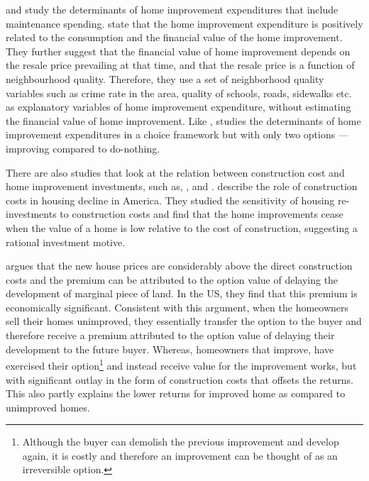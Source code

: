 \documentclass[AEJ,reqno, draftmode]{AEA} %
\begin{document}
\citet{boehm1986improvement} and \citet{galster1987homeowners} study the determinants of home improvement expenditures that include maintenance spending. \citet{boehm1986improvement} state that the home improvement expenditure is positively related to the consumption and the financial value of the home improvement. They further suggest that the financial value of home improvement depends on the resale price prevailing at that time, and that the resale price is a function of neighbourhood quality. Therefore, they use a set of neighborhood quality variables such as crime rate in the area, quality of schools, roads, sidewalks etc. as explanatory variables of home improvement expenditure, without estimating the financial value of home improvement. Like \citet{montgomery1992explaining}, \citet{galster1987homeowners} studies the determinants of home improvement expenditures in a choice framework but with only two options --- improving compared to do-nothing. 


There are also studies that look at the relation between construction cost and home improvement investments, such as, \cite{gyourko2004reinvestment}, \citet{guthrie2010house} and \citet{mendelsohn1977empirical}. \cite{gyourko2004reinvestment} describe the role of construction costs in housing decline in America. They studied the sensitivity of housing re-investments to construction costs and find that the home improvements cease when the value of a home is low relative to the cost of construction, suggesting a rational investment motive. 

\citet{guthrie2010house} argues that the new house prices are considerably above the direct construction costs and the premium can be attributed to the option value of delaying the development of marginal piece of land. In the US, they find that this premium is economically significant. Consistent with this argument, when the homeowners sell their homes unimproved, they essentially transfer the option to the buyer and therefore receive a premium attributed to the option value of delaying their development to the future buyer. Whereas, homeowners that improve, have exercised their option\footnote{Although the buyer can demolish the previous improvement and develop again, it is costly and therefore an improvement can be thought of as an irreversible option.} and instead receive value for the improvement works, but with significant outlay in the form of construction costs that offsets the returns. This also partly explains the lower returns for improved home as compared to unimproved homes. %
\end{document}
